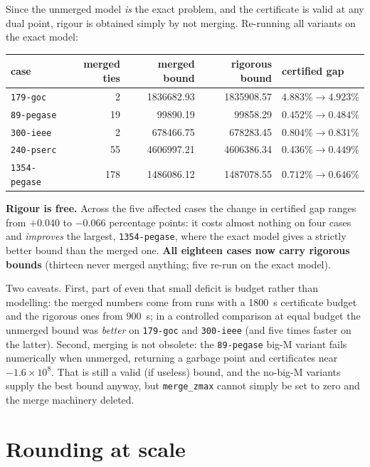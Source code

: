 \documentclass[11pt]{article}
\newcommand{\code}[1]{\texttt{\small #1}}
\begin{document}
Since the unmerged model \emph{is} the exact problem, and the certificate is valid at any dual point,
rigour is obtained simply by not merging. Re-running all variants on the exact model:

\begin{table}[h]\centering
\begin{tabular}{lrrrl}
\toprule
case & merged ties & merged bound & rigorous bound & certified gap \\
\midrule
\code{179-goc}   & 2  & \num{1836682.93} & \num{1835908.57} & $4.883\% \to 4.923\%$ \\
\code{89-pegase} & 19 & \num{99890.19}   & \num{99858.29}   & $0.452\% \to 0.484\%$ \\
\code{300-ieee}  & 2  & \num{678466.75}  & \num{678283.45}  & $0.804\% \to 0.831\%$ \\
\code{240-pserc} & 55 & \num{4606997.21} & \num{4606386.34} & $0.436\% \to 0.449\%$ \\
\code{1354-pegase} & 178 & \num{1486086.12} & \num{1487078.55} & $0.712\% \to \mathbf{0.646\%}$ \\
\bottomrule
\end{tabular}
\end{table}

\noindent
\textbf{Rigour is free.} Across the five affected cases the change in certified gap ranges from
$+0.040$ to $-0.066$ percentage points: it costs almost nothing on four cases and \emph{improves} the
largest, \code{1354-pegase}, where the exact model gives a strictly better bound than the merged one.
\textbf{All eighteen cases now carry rigorous bounds} (thirteen never merged anything; five re-run on
the exact model).

Two caveats. First, part of even that small deficit is budget rather than modelling: the merged numbers
come from runs with a \SI{1800}{\second} certificate budget and the rigorous ones from
\SI{900}{\second}; in a controlled comparison at equal budget the unmerged bound was \emph{better} on
\code{179-goc} and \code{300-ieee} (and five times faster on the latter). Second, merging is not
obsolete: the \code{89-pegase} big-M variant fails numerically when unmerged, returning a garbage point
and certificates near $-1.6\times 10^{8}$. That is still a valid (if useless) bound, and the no-big-M
variants supply the best bound anyway, but \code{merge\_zmax} cannot simply be set to zero and the merge
machinery deleted.

\section{Rounding at scale}
\end{document}
